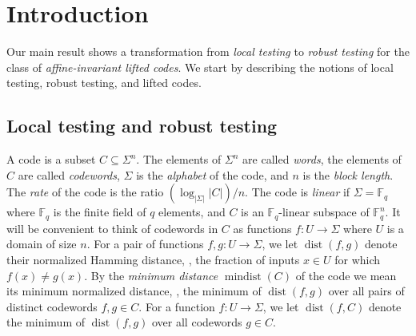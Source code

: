 \documentclass{toc}
\theoremstyle{plain}
\DeclareMathOperator{\dist}{dist} %
\DeclareMathOperator{\mindist}{mindist}  %
\newcommand{\F}{{\mathbb{F}}}
\begin{document}
\begin{frontmatter}
\begin{abstract}
To obtain the above transformation, we relate the notions of local testing and robust testing to the notion of \emph{agreement testing} that attempts to find out whether valid partial assignments can be stitched together to a global codeword. We first show that agreement testing implies robust testing, and then show that local testing implies agreement testing.  Our proof is combinatorial, and is based on sampling properties of the collection of local views of local testers.  Thus, it immediately applies to local testers of lifted codes that query random affine subspaces in $\F_q^m$, and moreover seems amenable to extension to other families of locally testable codes with expanding families of local views.
\end{abstract}

%

\end{frontmatter}

%
%
%


\section{Introduction}

Our main result shows a transformation from \emph{local testing} to \emph{robust testing} for the class of \emph{affine-invariant lifted codes}. We start by describing the notions of local testing, robust testing, and lifted codes.

\subsection{Local testing and robust testing}

A code is a subset $C \subseteq \Sigma^n$. The elements of
%
%
%
$\Sigma^n$ are called \emph{words}, the elements of %
$C$ are called \emph{codewords}, $\Sigma$ is the \emph{alphabet} of the code, and $n$ is the \emph{block length}. The \emph{rate} of the code is the ratio $(\log_{|\Sigma|}|C|) / n$. The code is \emph{linear} if $\Sigma = \F_q$ where $\F_q$ is the finite field of $q$ elements, and $C$ is an $\F_q$-linear subspace of $\F_q^n$.
It will be convenient to think of codewords in $C$ as functions $f: U \to \Sigma$ where $U$ is a domain of size $n$.
For a pair of functions $f,g: U \to \Sigma$, we let $\dist(f,g)$ denote
%
their normalized Hamming distance, \ie,  %
the fraction of inputs  $x \in U$ for which $f(x) \ne g(x)$.
%
%
By the \emph{minimum distance}  %
$\mindist(C)$ of the code  %
we mean its minimum normalized distance, \ie,  %
%
the minimum of $\dist(f,g)$ over all
pairs of %
distinct codewords $f,g \in C$.
For a function $f: U \to \Sigma$, we let  $\dist(f,C)$ denote
the minimum of $\dist(f,g)$ over all codewords $g \in C$.
\end{document}

